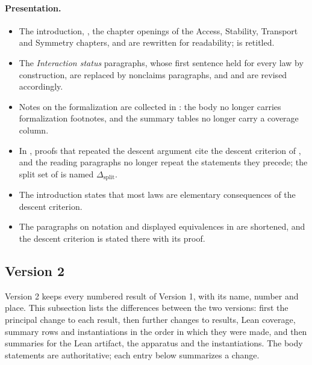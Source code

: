 \paragraph{Presentation.}
\begin{itemize}
\item The introduction, , the chapter openings of
  the Access, Stability, Transport and Symmetry chapters, and
  are rewritten for readability; 
  is retitled.
\item The \emph{Interaction status} paragraphs, whose first sentence held
  for every law by construction, are replaced by nonclaims paragraphs,
  and  and
   are revised
  accordingly.
\item Notes on the formalization are collected in
  : the body no longer carries formalization
  footnotes, and the summary tables no longer carry a coverage column.
\item In ,
  proofs that repeated the descent argument cite the descent criterion
  of , and the reading paragraphs no longer repeat
  the statements they precede; the split set of  is named
  \(\Delta_{\mathrm{split}}\).
\item The introduction states that most laws are elementary
  consequences of the descent criterion.
\item The paragraphs on notation and displayed equivalences in
   are shortened, and the descent criterion is
  stated there with its proof.
\end{itemize}

\subsection{Version 2}\label{subsec:version-2}

Version 2 keeps every numbered result of Version 1, with its name, number
and place. This subsection lists the differences between the two versions:
first the principal change to each result, then further changes to results,
Lean coverage, summary rows and instantiations in the order in which they were
made, and then summaries for the Lean artifact, the apparatus and the
instantiations. The body statements are authoritative; each entry below summarizes a change.

